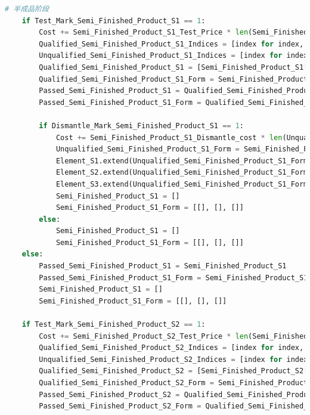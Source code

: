 \documentclass[withoutpreface,bwprint]{cumcmthesis} %
\begin{document}
\begin{appendices}
\begin{lstlisting}[language=python]
    # 半成品阶段
    if Test_Mark_Semi_Finished_Product_S1 == 1:
        Cost += Semi_Finished_Product_S1_Test_Price * len(Semi_Finished_Product_S1)
        Qualified_Semi_Finished_Product_S1_Indices = [index for index, value in enumerate(Semi_Finished_Product_S1) if value == 1]
        Unqualified_Semi_Finished_Product_S1_Indices = [index for index, value in enumerate(Semi_Finished_Product_S1) if value == 0]
        Qualified_Semi_Finished_Product_S1 = [Semi_Finished_Product_S1[i] for i in range(len(Semi_Finished_Product_S1)) if i in Qualified_Semi_Finished_Product_S1_Indices]
        Qualified_Semi_Finished_Product_S1_Form = Semi_Finished_Product_S1_Form[:, Qualified_Semi_Finished_Product_S1_Indices]
        Passed_Semi_Finished_Product_S1 = Qualified_Semi_Finished_Product_S1
        Passed_Semi_Finished_Product_S1_Form = Qualified_Semi_Finished_Product_S1_Form

        if Dismantle_Mark_Semi_Finished_Product_S1 == 1:
            Cost += Semi_Finished_Product_S1_Dismantle_cost * len(Unqualified_Semi_Finished_Product_S1_Indices)
            Unqualified_Semi_Finished_Product_S1_Form = Semi_Finished_Product_S1_Form[:, Unqualified_Semi_Finished_Product_S1_Indices]
            Element_S1.extend(Unqualified_Semi_Finished_Product_S1_Form[0])
            Element_S2.extend(Unqualified_Semi_Finished_Product_S1_Form[1])
            Element_S3.extend(Unqualified_Semi_Finished_Product_S1_Form[2])
            Semi_Finished_Product_S1 = []
            Semi_Finished_Product_S1_Form = [[], [], []]
        else:
            Semi_Finished_Product_S1 = []
            Semi_Finished_Product_S1_Form = [[], [], []]
    else:
        Passed_Semi_Finished_Product_S1 = Semi_Finished_Product_S1
        Passed_Semi_Finished_Product_S1_Form = Semi_Finished_Product_S1_Form
        Semi_Finished_Product_S1 = []
        Semi_Finished_Product_S1_Form = [[], [], []]

    if Test_Mark_Semi_Finished_Product_S2 == 1:
        Cost += Semi_Finished_Product_S2_Test_Price * len(Semi_Finished_Product_S2)
        Qualified_Semi_Finished_Product_S2_Indices = [index for index, value in enumerate(Semi_Finished_Product_S2) if value == 1]
        Unqualified_Semi_Finished_Product_S2_Indices = [index for index, value in enumerate(Semi_Finished_Product_S2) if value == 0]
        Qualified_Semi_Finished_Product_S2 = [Semi_Finished_Product_S2[i] for i in range(len(Semi_Finished_Product_S2)) if i in Qualified_Semi_Finished_Product_S2_Indices]
        Qualified_Semi_Finished_Product_S2_Form = Semi_Finished_Product_S2_Form[:, Qualified_Semi_Finished_Product_S2_Indices]
        Passed_Semi_Finished_Product_S2 = Qualified_Semi_Finished_Product_S2
        Passed_Semi_Finished_Product_S2_Form = Qualified_Semi_Finished_Product_S2_Form


\end{lstlisting}
\end{appendices}
\end{document}

